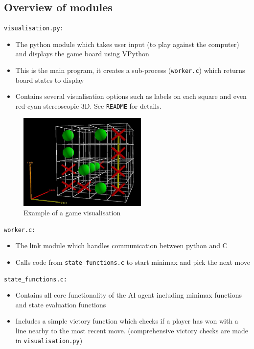\documentclass[10pt,twocolumn]{article}
\begin{document}
\subsection{Overview of modules}
\texttt{visualisation.py:}
\begin{itemize}
\item The python module which takes user input (to play against the computer) and displays the game board using VPython
\item This is the main program, it creates a sub-process (\texttt{worker.c}) which returns
board states to display
\item Contains several visualisation options such as labels on each square and even
red-cyan stereoscopic 3D. See \texttt{README} for details.
\end{itemize}
\begin{figure}[h]
  \begin{center}
    \includegraphics[width=2.5in]{vis.jpg}
  \end{center}
  \caption{Example of a game visualisation}
  \label{fig:vis}
\end{figure}
\texttt{worker.c:}
\begin{itemize}
\item The link module which handles communication between python and C
\item Calls code from \texttt{state\_functions.c} to start minimax and pick the next move
\end{itemize}
\texttt{state\_functions.c:}
\begin{itemize}
\item Contains all core functionality of the AI agent including minimax functions and state
evaluation functions
\item Includes a simple victory function which checks if a player has won with a line nearby to
the most recent move. (comprehensive victory checks are made in \texttt{visualisation.py})
\end{itemize}
\end{document}
